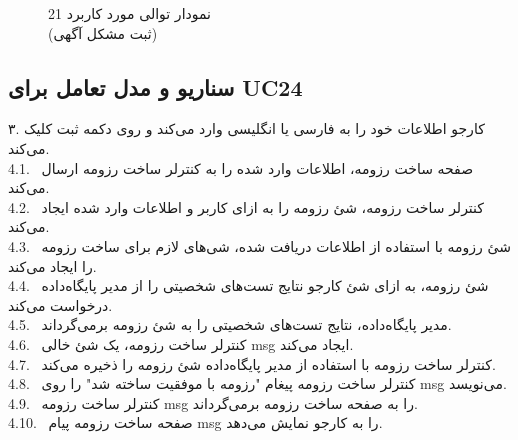 \documentclass[12pt]{article}
\begin{document}
	\begin{figure}[H]
		\centering
		\caption{نمودار توالی مورد کاربرد 21\\
			(ثبت مشکل آگهی)
		}
		\label{fig:sd-uc21}
	\end{figure}

	\subsection{سناریو و مدل تعامل برای UC24}
	۳. کارجو اطلاعات خود را به فارسی یا انگلیسی وارد می‌کند و روی دکمه ثبت کلیک می‌کند.\\
	4.1. \ صفحه ساخت رزومه، اطلاعات وارد شده را به کنترلر ساخت رزومه ارسال می‌کند.\\
	4.2. \ کنترلر ساخت رزومه، شئ رزومه را به ازای کاربر و اطلاعات وارد شده ایجاد می‌کند.\\
	4.3. \ شئ رزومه با استفاده از اطلاعات دریافت شده، شی‌های لازم برای ساخت رزومه را ایجاد می‌کند.\\
	4.4. \ شئ رزومه، به ازای شئ کارجو نتایج تست‌های شخصیتی را از مدیر پایگاه‌داده درخواست می‌کند.\\
	4.5. \ مدیر پایگاه‌داده، نتایج تست‌های شخصیتی را به شئ رزومه برمی‌گرداند.\\
	4.6. \ کنترلر ساخت رزومه، یک شئ خالی msg ایجاد می‌کند.\\
	4.7. \ کنترلر ساخت رزومه با استفاده از مدیر پایگاه‌داده شئ رزومه را ذخیره می‌کند.\\
	4.8. \ کنترلر ساخت رزومه پیغام "رزومه با موفقیت ساخته شد" را روی msg می‌نویسد.\\
	4.9. \ کنترلر ساخت رزومه msg را به صفحه ساخت رزومه برمی‌گرداند.\\
	4.10. \ صفحه ساخت رزومه پیام msg را به کارجو نمایش می‌دهد.
\end{document}
